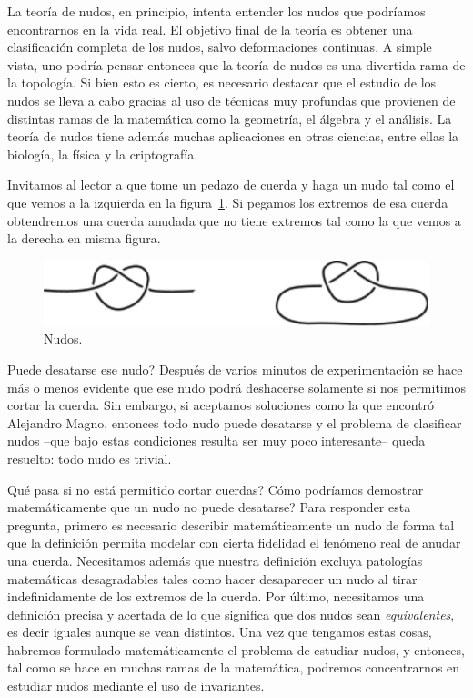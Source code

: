\documentclass[graybox]{svmult}
\begin{document}
La teoría de nudos, en principio, intenta entender los nudos que podríamos
encontrarnos en la vida real. 
El objetivo final de la teoría es obtener una clasificación completa de los nudos, salvo
deformaciones continuas. A simple vista, uno podría pensar entonces
que la teoría de nudos es una divertida rama de la topología. Si bien esto es
cierto, es necesario destacar que el estudio de los nudos se lleva a
cabo gracias al uso de técnicas muy profundas que provienen de distintas ramas
de la matemática como la geometría, el álgebra y el análisis. La teoría de
nudos tiene además muchas aplicaciones en otras ciencias, entre ellas la biología, la
física y la criptografía. 

Invitamos al lector a que tome un pedazo de cuerda y haga un nudo tal como el
que vemos a la izquierda en la figura~\ref{fig:nudo}. Si pegamos los extremos
de esa cuerda obtendremos una cuerda anudada que no tiene extremos tal como la
que vemos a la derecha en misma figura.

\begin{figure}
    \centering
	\includegraphics[scale=0.7]{images/real}
    \caption{Nudos.}
    \label{fig:nudo}
\end{figure}

\textquestiondown Puede desatarse ese nudo? Después de varios minutos de
experimentación se hace más o menos evidente que ese nudo podrá deshacerse
solamente si nos permitimos cortar la cuerda. Sin embargo, si aceptamos
soluciones como la que encontró Alejandro Magno, entonces todo nudo puede
desatarse y el problema de clasificar nudos --que bajo estas condiciones resulta ser muy poco
interesante-- queda resuelto: todo nudo es trivial.  

\textquestiondown Qué pasa si no está permitido cortar cuerdas?
\textquestiondown Cómo podríamos demostrar matemáticamente que un nudo no puede
desatarse?  Para responder esta pregunta, primero es necesario describir
matemáticamente un nudo de forma tal que la definición permita modelar con
cierta fidelidad el fenómeno real de anudar una cuerda. Necesitamos además que
nuestra definición excluya patologías matemáticas desagradables tales como
hacer desaparecer un nudo al tirar indefinidamente de los extremos de la
cuerda.  Por último, necesitamos una definición precisa y acertada de lo que
significa que dos nudos sean \emph{equivalentes}, es decir iguales aunque se
vean distintos. Una vez que tengamos estas cosas, habremos formulado
matemáticamente el problema de estudiar nudos, y entonces, tal como se hace en
muchas ramas de la matemática, podremos concentrarnos en estudiar nudos
mediante el uso de invariantes. 
\end{document}

